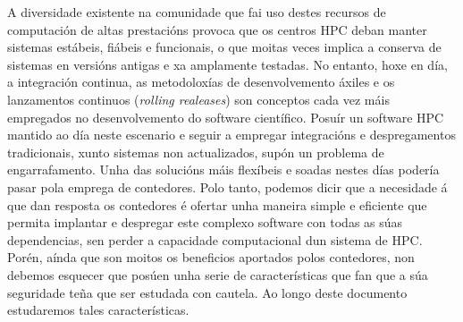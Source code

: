 A diversidade existente na comunidade que fai uso destes recursos de computación de altas prestacións provoca que os centros \gls{HPC} deban manter sistemas estábeis, fiábeis e funcionais, o que moitas veces implica a conserva de sistemas en versións antigas e xa amplamente testadas. No entanto, hoxe en día, a integración continua, as metodoloxías de desenvolvemento áxiles e os lanzamentos continuos (\textit{rolling realeases}) son conceptos cada vez máis empregados no desenvolvemento do software científico. Posuír un software \gls{HPC} mantido ao día neste escenario e seguir a empregar integracións e despregamentos tradicionais, xunto sistemas non actualizados, supón un problema de engarrafamento. Unha das solucións máis flexíbeis e soadas nestes días podería pasar pola emprega de contedores. Polo tanto, podemos dicir que a necesidade á que dan resposta os contedores é ofertar unha maneira simple e eficiente que permita implantar e despregar este complexo software con todas as súas dependencias, sen perder a capacidade computacional dun sistema de \gls{HPC}. Porén, aínda que son moitos os beneficios aportados polos contedores, non debemos esquecer que posúen unha serie de características que fan que a súa seguridade teña que ser estudada con cautela. Ao longo deste documento estudaremos tales características.